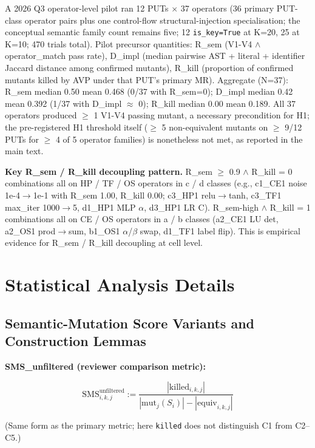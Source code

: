 \documentclass[manuscript,screen,review]{acmart}
\begin{document}
A 2026 Q3 operator-level pilot ran 12 PUTs $\times$ 37 operators (36
primary PUT-class operator pairs plus one control-flow structural-injection
specialisation; the conceptual semantic family count remains five; 12
\texttt{is\_key=True} at K=20, 25 at K=10; 470 trials total). Pilot
precursor quantities: R\_sem (V1-V4 $\wedge$ operator\_match pass rate),
D\_impl (median pairwise AST + literal + identifier Jaccard distance
among confirmed mutants), R\_kill (proportion of confirmed mutants
killed by AVP under that PUT's primary MR). Aggregate (N=37): R\_sem
median 0.50 mean 0.468 (0/37 with R\_sem=0); D\_impl median 0.42 mean
0.392 (1/37 with D\_impl $\approx$ 0); R\_kill median 0.00 mean 0.189. All 37
operators produced $\geq$ 1 V1-V4 passing mutant, a necessary
precondition for H1; the pre-registered H1 threshold itself ($\geq$ 5
non-equivalent mutants on $\geq$ 9/12 PUTs for $\geq$ 4 of 5 operator
families) is nonetheless not met, as reported in the main text.

\textbf{Key R\_sem / R\_kill decoupling pattern.} R\_sem $\geq$ 0.9 $\wedge$ R\_kill
= 0 combinations all on HP / TF / OS operators in c / d classes (e.g.,
c1\_CE1 noise 1e-4$\to$1e-1 with R\_sem 1.00, R\_kill 0.00; c3\_HP1
relu$\to$tanh, c3\_TF1 max\_iter 1000$\to$5, d1\_HP1 MLP $\alpha$, d3\_HP1 LR C).
R\_sem-high $\wedge$ R\_kill = 1 combinations all on CE / OS operators in a / b
classes (a2\_CE1 LU det, a2\_OS1 prod$\to$sum, b1\_OS1 $\alpha$/$\beta$ swap, d1\_TF1
label flip). This is empirical evidence for R\_sem / R\_kill decoupling at cell level.


\section{Statistical Analysis Details}\label{d.-statistical-analysis-details}

\subsection{Semantic-Mutation Score Variants and Construction Lemmas}\label{d.1-sms-variants-and-construction-lemmas}

\textbf{SMS\_unfiltered (reviewer comparison metric):}

\[
\mathrm{SMS}^{\mathrm{unfiltered}}_{i,k,j} := \frac{|\mathrm{killed}_{i,k,j}|}{|\mathrm{mut}_j(S_i)| - |\mathrm{equiv}_{i,k,j}|}
\]

(Same form as the primary metric; here \texttt{killed} does not distinguish C1 from C2--C5.)
\end{document}
